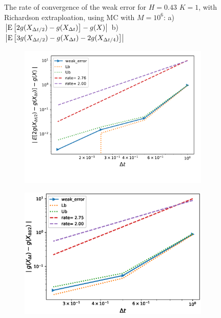 \documentclass[11pt]{article}
\newcommand{\expt}[1]{\mathrm{E}\left[#1\right]}
\begin{document}
\begin{figure}[h!]
	\caption{The rate of convergence of the weak error for $H=0.43$ $K=1$, with Richardson extraploation, using MC with $M=10^6$: a) $\abs{\expt{2 g(X_{\Delta t/2}) -g(X_{\Delta t})}-g(X)}$  b) $\abs{\expt{3 g(X_{\Delta t/2})-g(X_{\Delta t})-2 g(X_{\Delta t/4})}}$ }
	\label{fig:Weak_rate_H_043_with_rich}
\end{figure}

\begin{figure}[h!]
	\centering
	\begin{subfigure}{.4\textwidth}
		\centering
		\includegraphics[width=1\linewidth]{./figures/rBergomi_weak_error_rates/with_richardson/H_007/weak_convergence_order_Bergomi_H_007_K_1_richardson_relative_M_10_6}
		\caption{}
		\label{fig:sub3}
	\end{subfigure}%
	\begin{subfigure}{.4\textwidth}
		\centering
		\includegraphics[width=1\linewidth]{./figures/rBergomi_weak_error_rates/with_richardson/H_007/weak_convergence_order_differences_Bergomi_H_007_K_1_richardson_relative_M_10_6}
		\caption{}
		\label{fig:sub4}
	\end{subfigure}
	

\end{figure}
\end{document}
